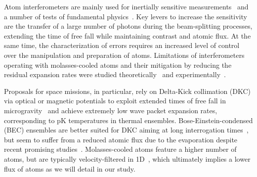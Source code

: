 %
%


Atom interferometers are mainly used for inertially sensitive measurements~\cite{Geiger2020arxiv} and a number of tests of fun\-da\-men\-tal physics~\cite{Bouchendira2011,Asenbaum2020arxiv}.
Key levers to increase the sensitivity are the transfer of a large number of photons during the beam-splitting processes, extending the time of free fall while maintaining contrast and atomic flux.
At the same time, the characterization of errors requires an increased level of control over the manipulation and preparation of atoms.
Limitations of interferometers operating with molasses-cooled atoms and their mitigation by reducing the residual expansion rates were studied theoretically~\cite{Loriani2019} and experimentally~\cite{LouchetChauvet2011,Schkolnik2015}.

Proposals for space missions, in particular, rely on Delta-Kick collimation (DKC) via optical or magnetic potentials to exploit extended times of free fall in microgravity~\cite{Chu1986,Ammann1997,Mntinga2013,Kovachy2015} and achieve extremely low wave packet expansion rates, corresponding to pK temperatures in thermal ensembles.
Bose-Einstein-condensed (BEC) ensembles are better suited for DKC aiming at long interrogation times~\cite{Loriani2019}, but seem to suffer from a reduced atomic flux due to the evaporation despite recent promising studies~\cite{Rudolph2015}.
Molasses-cooled atoms feature a higher number of atoms, but are typically velocity-filtered in 1D~\cite{Kasevich1991}, which ultimately implies a lower flux of atoms as we will detail in our study.

